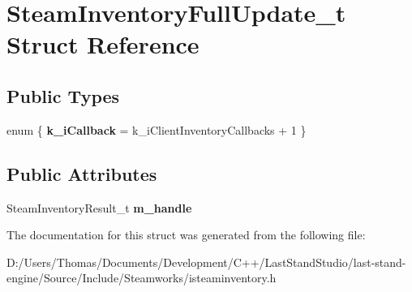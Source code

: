 \hypertarget{structSteamInventoryFullUpdate__t}{}\section{Steam\+Inventory\+Full\+Update\+\_\+t Struct Reference}
\label{structSteamInventoryFullUpdate__t}
\subsection*{Public Types}
\begin{DoxyCompactItemize}
\item 
\hypertarget{structSteamInventoryFullUpdate__t_ad44384ca7bad8f44402b1105373e3d7f}{}enum \{ {\bfseries k\+\_\+i\+Callback} = k\+\_\+i\+Client\+Inventory\+Callbacks + 1
 \}\label{structSteamInventoryFullUpdate__t_ad44384ca7bad8f44402b1105373e3d7f}

\end{DoxyCompactItemize}
\subsection*{Public Attributes}
\begin{DoxyCompactItemize}
\item 
\hypertarget{structSteamInventoryFullUpdate__t_a2864555021de3bf6e254536adfc0748a}{}Steam\+Inventory\+Result\+\_\+t {\bfseries m\+\_\+handle}\label{structSteamInventoryFullUpdate__t_a2864555021de3bf6e254536adfc0748a}

\end{DoxyCompactItemize}


The documentation for this struct was generated from the following file\+:\begin{DoxyCompactItemize}
\item 
D\+:/\+Users/\+Thomas/\+Documents/\+Development/\+C++/\+Last\+Stand\+Studio/last-\/stand-\/engine/\+Source/\+Include/\+Steamworks/isteaminventory.\+h\end{DoxyCompactItemize}
